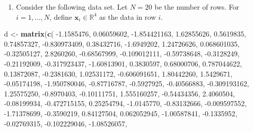 \documentclass[12pt,krantz2]{krantz}
\makeatletter
\newenvironment{Shaded}{\begin{snugshade}}{\end{snugshade}}
\newcommand{\FloatTok}[1]{\textcolor[rgb]{0.06,0.06,0.06}{#1}}
\newcommand{\KeywordTok}[1]{\textcolor[rgb]{0.27,0.27,0.27}{\textbf{#1}}}
\newcommand{\NormalTok}[1]{#1}
\newcommand{\StringTok}[1]{\textcolor[rgb]{0.5,0.5,0.5}{#1}}
\providecommand{\tightlist}{%
  \setlength{\itemsep}{0pt}\setlength{\parskip}{0pt}}
\newenvironment{kframe}{%
\medskip{}
\setlength{\fboxsep}{.8em}
 \def\at@end@of@kframe{}%
 \ifinner\ifhmode%
  \def\at@end@of@kframe{\end{minipage}}%
  \begin{minipage}{\columnwidth}%
 \fi\fi%
 \def\FrameCommand##1{\hskip\@totalleftmargin \hskip-\fboxsep
 \colorbox{shadecolor}{##1}\hskip-\fboxsep
     \hskip-\linewidth \hskip-\@totalleftmargin \hskip\columnwidth}%
 \MakeFramed {\advance\hsize-\width
   \@totalleftmargin\z@ \linewidth\hsize
   \@setminipage}}%
 {\par\unskip\endMakeFramed%
 \at@end@of@kframe}
\renewenvironment{Shaded}{\begin{kframe}}{\end{kframe}}
\makeatother
\begin{document}
\begin{enumerate}
\def\labelenumi{\arabic{enumi}.}
\tightlist
\item
  Consider the following data set. Let \(N = 20\) be the number of rows. For \(i=1,\ldots,N\), define \(\mathbf{x}_i \in \mathbb{R}^4\) as the data in row \(i\).
\end{enumerate}

\begin{Shaded}
\begin{Highlighting}[]
\NormalTok{d <-}\StringTok{ }\KeywordTok{matrix}\NormalTok{(}\KeywordTok{c}\NormalTok{(}
  \FloatTok{-1.1585476}\NormalTok{,  }\FloatTok{0.06059602}\NormalTok{, }\FloatTok{-1.854421163}\NormalTok{,  }\FloatTok{1.62855626}\NormalTok{,}
  \FloatTok{0.5619835}\NormalTok{,  }\FloatTok{0.74857327}\NormalTok{, }\FloatTok{-0.830973409}\NormalTok{,  }\FloatTok{0.38432716}\NormalTok{,}
  \FloatTok{-1.6949202}\NormalTok{,  }\FloatTok{1.24726626}\NormalTok{,  }\FloatTok{0.068601035}\NormalTok{, }\FloatTok{-0.32505127}\NormalTok{,}
  \FloatTok{2.8260260}\NormalTok{, }\FloatTok{-0.68567999}\NormalTok{, }\FloatTok{-0.109012111}\NormalTok{, }\FloatTok{-0.59738648}\NormalTok{,}
  \FloatTok{-0.3128249}\NormalTok{, }\FloatTok{-0.21192009}\NormalTok{, }\FloatTok{-0.317923437}\NormalTok{, }\FloatTok{-1.60813901}\NormalTok{,}
  \FloatTok{0.3830597}\NormalTok{,  }\FloatTok{0.68000706}\NormalTok{,  }\FloatTok{0.787044622}\NormalTok{,  }\FloatTok{0.13872087}\NormalTok{,}
  \FloatTok{-0.2381630}\NormalTok{,  }\FloatTok{1.02531172}\NormalTok{, }\FloatTok{-0.606091651}\NormalTok{,  }\FloatTok{1.80442260}\NormalTok{,}
  \FloatTok{1.5429671}\NormalTok{, }\FloatTok{-0.05174198}\NormalTok{, }\FloatTok{-1.950780046}\NormalTok{, }\FloatTok{-0.87716787}\NormalTok{,}
  \FloatTok{-0.5927925}\NormalTok{, }\FloatTok{-0.40566883}\NormalTok{, }\FloatTok{-0.309193162}\NormalTok{,  }\FloatTok{1.25575250}\NormalTok{,}
  \FloatTok{-0.8970403}\NormalTok{, }\FloatTok{-0.10111751}\NormalTok{,  }\FloatTok{1.555160257}\NormalTok{, }\FloatTok{-0.54434356}\NormalTok{,}
  \FloatTok{2.4060504}\NormalTok{, }\FloatTok{-0.08199934}\NormalTok{, }\FloatTok{-0.472715155}\NormalTok{,  }\FloatTok{0.25254794}\NormalTok{,}
  \FloatTok{-1.0145770}\NormalTok{, }\FloatTok{-0.83132666}\NormalTok{, }\FloatTok{-0.009597552}\NormalTok{, }\FloatTok{-1.71378699}\NormalTok{,}
  \FloatTok{-0.3590219}\NormalTok{,  }\FloatTok{0.84127504}\NormalTok{,  }\FloatTok{0.062052945}\NormalTok{, }\FloatTok{-1.00587841}\NormalTok{,}
  \FloatTok{-0.1335952}\NormalTok{, }\FloatTok{-0.02769315}\NormalTok{, }\FloatTok{-0.102229046}\NormalTok{, }\FloatTok{-1.08526057}\NormalTok{,}

\end{Highlighting}
\end{Shaded}
\end{document}
